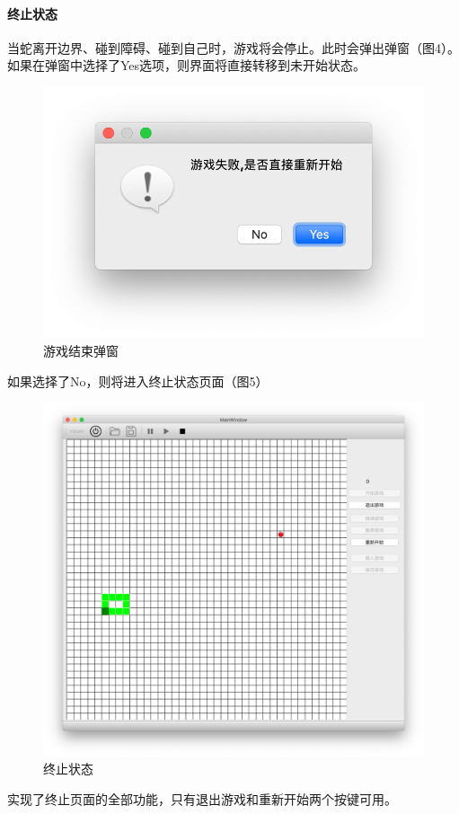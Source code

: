 \documentclass[utf-8]{ctexart}
\begin{document}
    \paragraph{终止状态}
    当蛇离开边界、碰到障碍、碰到自己时，游戏将会停止。此时会弹出弹窗（图4）。如果在弹窗中选择了Yes选项，则界面将直接转移到未开始状态。
    \begin{figure}[H]
        \centering
        \includegraphics[scale = 0.4]{texsrc/游戏结束弹窗.png}
        \caption{游戏结束弹窗}
        \label{messagebox}
    \end{figure}
    如果选择了No，则将进入终止状态页面（图5）
    \begin{figure}[H]
        \centering
        \includegraphics[scale = 0.2]{texsrc/终止状态界面.png}
        \caption{终止状态}
        \label{ended}
    \end{figure}
    实现了终止页面的全部功能，只有退出游戏和重新开始两个按键可用。
\end{document}
